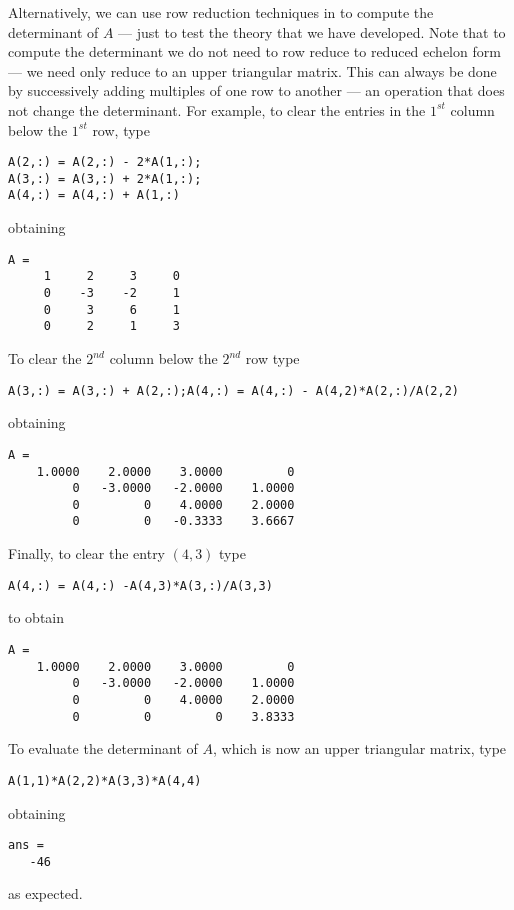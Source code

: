 \documentclass{ximera}
\begin{document}
Alternatively, we can use row reduction techniques in \Matlab to
compute the determinant of $A$ --- just to test the theory that
we have developed.  Note that to compute the determinant we do
not need to row reduce to 
reduced echelon form --- we need only
reduce to an upper triangular matrix.  This can always be done
by successively adding multiples of one row to another --- an
operation that does not change the determinant.  For example,
to clear the entries in the $1^{st}$ column below the $1^{st}$
row, type
\begin{verbatim}
A(2,:) = A(2,:) - 2*A(1,:);
A(3,:) = A(3,:) + 2*A(1,:); 
A(4,:) = A(4,:) + A(1,:)
\end{verbatim}
obtaining 
\begin{verbatim}
A =
     1     2     3     0
     0    -3    -2     1
     0     3     6     1
     0     2     1     3
\end{verbatim}
To clear the $2^{nd}$ column below the $2^{nd}$ row type 
\begin{verbatim}
A(3,:) = A(3,:) + A(2,:);A(4,:) = A(4,:) - A(4,2)*A(2,:)/A(2,2)\end{verbatim}
obtaining
\begin{verbatim}
A =
    1.0000    2.0000    3.0000         0
         0   -3.0000   -2.0000    1.0000
         0         0    4.0000    2.0000
         0         0   -0.3333    3.6667
\end{verbatim}
Finally, to clear the entry $(4,3)$ type
\begin{verbatim}
A(4,:) = A(4,:) -A(4,3)*A(3,:)/A(3,3)\end{verbatim}
to obtain
\begin{verbatim}
A =
    1.0000    2.0000    3.0000         0
         0   -3.0000   -2.0000    1.0000
         0         0    4.0000    2.0000
         0         0         0    3.8333
\end{verbatim}
To evaluate the determinant of $A$, which is now an upper
triangular matrix, type
\begin{verbatim}
A(1,1)*A(2,2)*A(3,3)*A(4,4)\end{verbatim}
obtaining
\begin{verbatim}
ans =
   -46
\end{verbatim}
as expected.

\EXER

\TEXER
\end{document}
